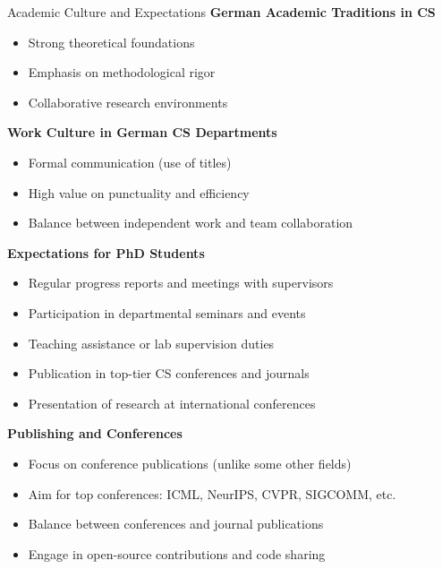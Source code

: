\documentclass[aspectratio=169,10pt]{beamer}
\begin{document}
\begin{frame}{Academic Culture and Expectations}
    \textbf{German Academic Traditions in CS}
    \begin{itemize}
        \item Strong theoretical foundations
        \item Emphasis on methodological rigor
        \item Collaborative research environments
    \end{itemize}
    
    \textbf{Work Culture in German CS Departments}
    \begin{itemize}
        \item Formal communication (use of titles)
        \item High value on punctuality and efficiency
        \item Balance between independent work and team collaboration
    \end{itemize}
    
    \textbf{Expectations for PhD Students}
    \begin{itemize}
        \item Regular progress reports and meetings with supervisors
        \item Participation in departmental seminars and events
        \item Teaching assistance or lab supervision duties
        \item Publication in top-tier CS conferences and journals
        \item Presentation of research at international conferences
    \end{itemize}
    
    \textbf{Publishing and Conferences}
    \begin{itemize}
        \item Focus on conference publications (unlike some other fields)
        \item Aim for top conferences: ICML, NeurIPS, CVPR, SIGCOMM, etc.
        \item Balance between conferences and journal publications
        \item Engage in open-source contributions and code sharing
    \end{itemize}
\end{frame}
\end{document}
